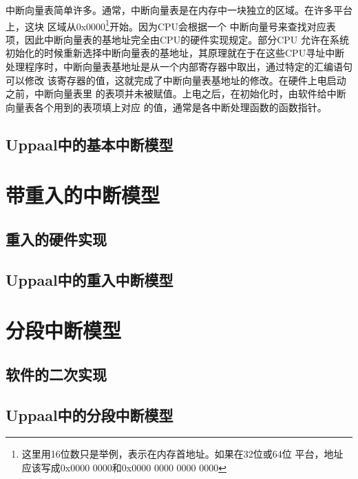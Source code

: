 中断向量表简单许多。通常，中断向量表是在内存中一块独立的区域。在许多平台上，这块
区域从0x0000\footnote{这里用16位数只是举例，表示在内存首地址。如果在32位或64位
平台，地址应该写成0x0000 0000和0x0000 0000 0000 0000}开始。因为CPU会根据一个
中断向量号来查找对应表项，因此中断向量表的基地址完全由CPU的硬件实现规定。部分CPU
允许在系统初始化的时候重新选择中断向量表的基地址，其原理就在于在这些CPU寻址中断
处理程序时，中断向量表基地址是从一个内部寄存器中取出，通过特定的汇编语句可以修改
该寄存器的值，这就完成了中断向量表基地址的修改。在硬件上电启动之前，中断向量表里
的表项并未被赋值。上电之后，在初始化时，由软件给中断向量表各个用到的表项填上对应
的值，通常是各中断处理函数的函数指针。

\subsection{Uppaal中的基本中断模型}
\label{subsec:basic_uppaal}

\section{带重入的中断模型}
\label{sec:reentrant}

\subsection{重入的硬件实现}
\label{subsec:reentrant_hardware}

\subsection{Uppaal中的重入中断模型}
\label{subsec:reentrant_uppaal}

\section{分段中断模型}
\label{sec:segment}

\subsection{软件的二次实现}
\label{subsec:segment_software}

\subsection{Uppaal中的分段中断模型}
\label{subsec:segment_uppaal}